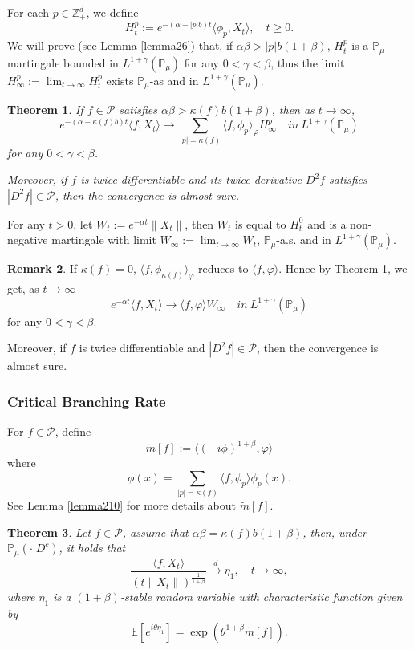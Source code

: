 \documentclass[12pt,oneside,english]{amsart}
\theoremstyle{plain}
\newtheorem{thm}{Theorem}[section]
\theoremstyle{definition}
\newtheorem{rem}[thm]{Remark}
\numberwithin{equation}{section}
\begin{document}
For each $p\in \mathbb{Z}_+^d$, we define
$$H_t^p:= e^{-(\alpha-|p|b)t}\langle\phi_p,X_t\rangle,\quad t\geq 0.$$
 We will prove (see Lemma \ref{lemma26}) that, if $\alpha\beta>|p|b(1+\beta)$, $H_t^p$ is a $\mathbb{P}_{\mu}$-martingale bounded in $L^{1+\gamma}(\mathbb{P}_{\mu})$ for any $0<\gamma<\beta$, thus the limit $H^p_{\infty}:=\lim_{t\rightarrow \infty}H_t^p$ exists $\mathbb{P}_{\mu}$-as and in $L^{1+\gamma}(\mathbb{P}_{\mu})$.
 \begin{thm}\label{Theorem11}
     If $f \in \mathcal{P}$ satisfies $\alpha\beta>\kappa(f)b(1+\beta)$, then as $t\rightarrow \infty$,
     $$e^{-(\alpha-\kappa(f)b)t}\langle f, X_t\rangle \rightarrow\sum_{|p|=\kappa(f)}\langle f, \phi_p\rangle_{\varphi} H_{\infty}^p \quad in~ L^{1+\gamma}(\mathbb{P}_{\mu})$$
     for any $0<\gamma<\beta$.

     Moreover, if $f$ is twice differentiable and its twice derivative $D^2 f$ satisfies $|D^2 f| \in \mathcal{P}$, then the convergence is almost sure.
 \end{thm}
For any $t>0$, let $W_t:=e^{-\alpha t}\|X_t\|$, then $W_t$ is equal to $H_t^0$ and is a non-negative martingale with limit $W_{\infty}:=\lim_{t\rightarrow\infty}W_t$,  $\mathbb{P}_{\mu}$-a.s. and in $L^{1+\gamma}(\mathbb{P}_{\mu})$.
 \begin{rem}
    If $\kappa(f)=0$, $\langle f, \phi_{\kappa(f)}\rangle_{\varphi}$ reduces to $\langle f,\varphi\rangle$. Hence by Theorem \ref{Theorem11}, we get, as $t\rightarrow \infty$
     $$e^{-\alpha t}\langle f, X_t\rangle \rightarrow \langle f, \varphi\rangle W_{\infty} \quad in~ L^{1+\gamma}(\mathbb{P}_{\mu})$$
    for any $0<\gamma<\beta$.

    Moreover, if $f$ is twice differentiable and $|D^2 f| \in \mathcal{P}$, then the convergence is almost sure.
 \end{rem}

\subsubsection{Critical Branching Rate}
For $f\in \mathcal{P}$, define
$$\tilde{m}[f]:= \langle(-i\phi)^{1+\beta},\varphi\rangle$$
where
$$\phi(x)=\sum_{|p|=\kappa(f)}\langle f,\phi_p\rangle\phi_p(x).$$
See Lemma \ref{lemma210} for more details about $\tilde{m}[f]$.
\begin{thm}\label{Theorem12}
Let $f\in\mathcal{P}$, assume that  $\alpha\beta=\kappa(f)b(1+\beta)$, then, under $\mathbb{P}_{\mu}(\cdot|D^c)$, it holds that
$$\frac{\langle f,X_t\rangle}{\left(t\|X_t\|\right)^{\frac{1}{1+\beta}}}\xrightarrow{d} \eta_1, \quad t\rightarrow \infty,$$
where $\eta_1$ is a $(1+\beta)$-stable random variable with characteristic function given by
$$\mathbb{E} [e^{i\theta \eta_1}]=\exp(\theta^{1+\beta}\tilde{m}[f]).$$
\end{thm}
\end{document}
